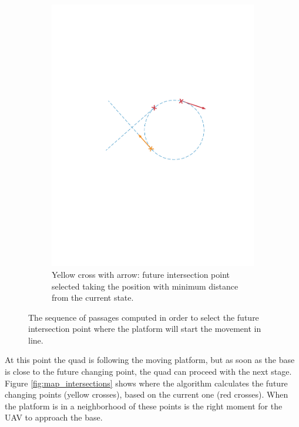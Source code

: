 \begin{itemize}
\begin{figure}[!htbp]
    \begin{subfigure}[b]{0.45\textwidth}
        \includegraphics[width=\textwidth]{img/intersection_5.pdf}
        \caption{Yellow cross with arrow: future intersection point selected taking the position with minimum distance from the current state. }
        \label{fig:five}
   \end{subfigure}
  \caption{The sequence of passages computed in order to select the future intersection point where the platform will start the movement in line.}
  \label{fig:sequence_find_next_intersection}
\end{figure} 
\end{itemize}

At this point the quad is following the moving platform, but as soon as the base is close to the future changing point, the quad can proceed with the next stage.\\

Figure \ref{fig:map_intersections} shows where the algorithm calculates the future changing points (yellow crosses), based on the current one (red crosses). When the platform is in a neighborhood of these points is the right moment for the UAV to approach the base.

